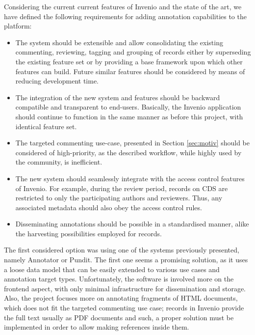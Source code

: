 
Considering the current current features of Invenio and the state of the art, we
have defined the following requirements for adding annotation capabilities to
the platform:
\begin{itemize}
  \item The system should be extensible and allow consolidating the existing
        commenting, reviewing, tagging and grouping of records either by
        superseding the existing feature set or by providing a base framework
        upon which other features can build. Future similar features should be
        considered by means of reducing development time.
  \item The integration of the new system and features should be backward
        compatible and transparent to end-users. Basically, the Invenio
        application should continue to function in the same manner as before
        this project, with identical feature set.
  \item The targeted commenting use-case, presented in Section \ref{sec:motiv}
        should be considered of high-priority, as the described workflow, while
        highly used by the community, is inefficient.
  \item The new system should seamlessly integrate with the access control
        features of Invenio. For example, during the review period, records on
        CDS are restricted to only the participating authors and reviewers.
        Thus, any associated metadata should also obey the access control rules.
  \item Disseminating annotations should be possible in a standardised manner,
        alike the harvesting possibilities employed for records.
\end{itemize}

The first considered option was using one of the systems previously presented,
namely Annotator or Pundit. The first one seems a promising solution, as it
uses a loose data model that can be easily extended to various use cases and
annotation target types. Unfortunately, the software is involved more on the
frontend aspect, with only minimal infrastructure for dissemination and
storage. Also, the project focuses more on annotating fragments of HTML
documents, which does not fit the targeted commenting use case; records in
Invenio provide the full text usually as PDF documents and such, a proper
solution must be implemented in order to allow making references inside them.

